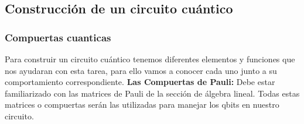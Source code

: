 \documentclass[spanish]{beamer}
\begin{document}
\justify\subsection{Construcción de un circuito cuántico}
\begin{frame}[fragile]
\frametitle{Compuertas cuanticas} 
Para construir un circuito cuántico tenemos diferentes elementos y funciones que nos ayudaran con esta tarea, para ello vamos a conocer cada uno junto a su comportamiento correspondiente.
 \textbf{Las Compuertas de Pauli:}
     Debe estar familiarizado con las matrices de Pauli de la sección de álgebra lineal. Todas estas matrices o compuertas serán las utilizadas para manejar los qbits en nuestro circuito.
\end{frame}

\end{document}
